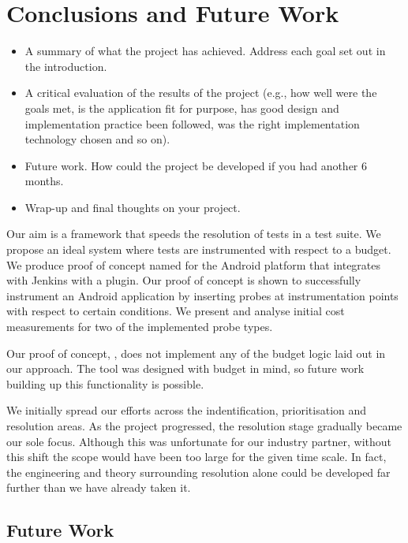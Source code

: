 \section{Conclusions and Future Work}
\label{sec:conc}

\begin{mdframed}
	\begin{itemize}
		\item A summary of what the project has achieved. Address each goal set out
		in the introduction.
		\item A critical evaluation of the results of the project (e.g., how well
		were the goals met, is the application fit for purpose, has good design and
		implementation practice been followed, was the right implementation
		technology chosen and so on).
		\item Future work. How could the project be developed if you had another 6
		months.
		\item Wrap-up and final thoughts on your project.
	\end{itemize}
\end{mdframed}

Our aim is a framework that speeds the resolution of \flaky tests in a test
suite. We propose an ideal system where tests are instrumented with respect to a
budget. We produce proof of concept named for the Android platform that
integrates with Jenkins with a plugin. Our proof of concept is shown to
successfully instrument an Android application by inserting probes at
instrumentation points with respect to certain conditions. We present and
analyse initial cost measurements for two of the implemented probe types.

Our proof of concept, \venera, does not implement any of the budget logic laid
out in our approach. The tool was designed with budget in mind, so future work
building up this functionality is possible.

We initially spread our efforts across the indentification, prioritisation and
resolution areas. As the project progressed, the resolution stage gradually
became our sole focus. Although this was unfortunate for our industry partner,
without this shift the scope would have been too large for the given time scale.
In fact, the engineering and theory surrounding resolution alone could be
developed far further than we have already taken it.


\subsection{Future Work}

